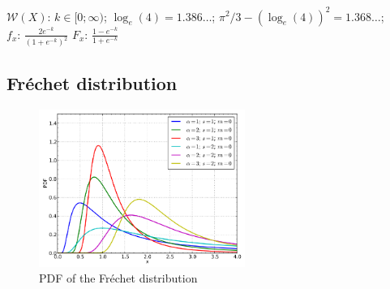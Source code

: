     {\color{darkblue} \textbf{$\mathcal{W}(X)$}:} {$k \in [0;\infty)\!$}; {$\log_e(4)=1.386\ldots$}; {$\pi^2/3-(\log_e(4))^2=1.368\ldots$};\hspace{0.5cm}\\{\color{darkblue} \textbf{$f_x$}:} {$\frac{2 e^{-k}}{(1+e^{-k})^2}\!$}{\color{darkblue} \textbf{$F_x$}:} {$\frac{1-e^{-k}}{1+e^{-k}}\!$}



    
        
\subsection{Fréchet distribution}


    \begin{figure}[H]
        \centering
        \includegraphics[width=0.6\textwidth]{images/Frechet pdf.png}
        \caption{PDF of the Fréchet distribution}
    \end{figure}




